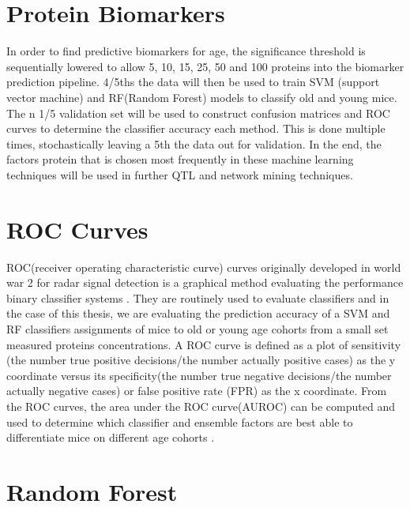 \documentclass[a4paper,11pt,twoside]{book}
\begin{document}
	\section{Protein Biomarkers}
	
    In order to find predictive biomarkers for age, the significance threshold is sequentially lowered to allow 5, 10, 15, 25, 50 and 100 proteins into the biomarker prediction pipeline. 4/5ths the data will then be used to train SVM (support vector machine) and RF(Random Forest) models to classify old and young mice. The n 1/5 validation set will be used to construct confusion matrices and ROC curves to determine the classifier accuracy each method. This is done multiple times, stochastically leaving a 5th the data out for validation. In the end, the factors protein that is chosen most frequently in these machine learning techniques will be used in further QTL and network mining techniques. 
	
	\section{ROC Curves}
	
    ROC(receiver operating characteristic curve) curves originally developed in world war 2 for radar signal detection is a graphical method evaluating the performance binary classifier systems \citep{HajianTilaki2013}. They are routinely used to evaluate classifiers and in the case of this thesis, we are evaluating the prediction accuracy of a SVM and RF classifiers assignments of mice to old or young age cohorts from a small set measured proteins concentrations. A ROC curve is defined as a plot of sensitivity (the number true positive decisions/the number actually positive cases) as the y coordinate versus its specificity(the number true negative decisions/the number actually negative cases) or false positive rate (FPR) as the x coordinate. From the ROC curves, the area under the ROC curve(AUROC) can be computed and used to determine which classifier and ensemble factors are best able to differentiate mice on different age cohorts \citep{HajianTilaki2013}.
	
	\section{Random Forest}
	
\end{document}
